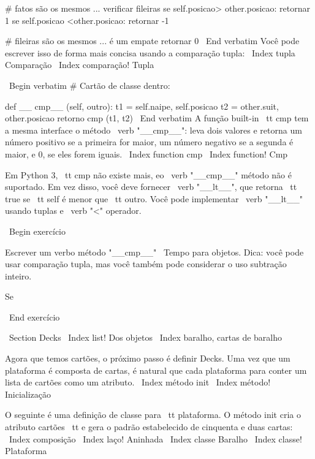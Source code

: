 \documentclass[10pt]{book}
\begin{document}
\begin {itemize}
{{{{{{{{{{{{{{{{        # fatos são os mesmos ... verificar fileiras
        se self.posicao> other.posicao: retornar 1
        se self.posicao <other.posicao: retornar -1

        # fileiras são os mesmos ... é um empate
        retornar 0    
\ End {verbatim}
%
Você pode escrever isso de forma mais concisa usando a comparação tupla:
\ Index {tupla Comparação}
\ Index {comparação! Tupla}

\ Begin {verbatim}
# Cartão de classe dentro:

    def __ cmp__ (self, outro):
        t1 = self.naipe, self.posicao
        t2 = other.suit, other.posicao
        retorno cmp (t1, t2)
\ End {verbatim}
%
A função built-in {\ tt cmp} tem a mesma interface
o método \ verb "__cmp__": leva dois valores e retorna
um número positivo se a primeira for maior, um número negativo
se a segunda é maior, e 0, se eles forem iguais.
\ Index {function cmp}
\ Index {function! Cmp}

Em Python 3, {\ tt cmp} não existe mais, eo \ verb "__cmp__"
método não é suportado. Em vez disso, você deve fornecer \ verb "__lt__",
que retorna {\ tt true} se {\ tt self} é menor que {\ tt outro}.
Você pode implementar \ verb "__lt__" usando tuplas e \ verb "<"
operador.

\ Begin {} exercício

Escrever um verbo método "__cmp__" \ Tempo para objetos. Dica: você
pode usar comparação tupla, mas você também pode considerar o uso
subtração inteiro.


Se%

\ End {} exercício


\ Section {} Decks
\ Index {list! Dos objetos}
\ Index {baralho, cartas de baralho}

Agora que temos cartões, o próximo passo é definir Decks. Uma vez que um
plataforma é composta de cartas, é natural que cada plataforma para conter um
lista de cartões como um atributo.
\ Index {método init}
\ Index {método! Inicialização}

O seguinte é uma definição de classe para {\ tt plataforma}. O
método init cria o atributo {cartões \ tt} e gera
o padrão estabelecido de cinquenta e duas cartas:
\ Index {composição}
\ Index {laço! Aninhada}
\ Index {classe Baralho}
\ Index {classe! Plataforma}

}}}}}}}}}}}}}}}}
\end{itemize}
\end{document}
